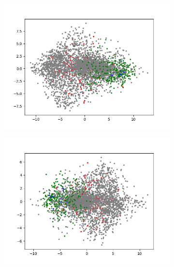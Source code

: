 \begin{figure}[H]
\begin{subfigure}{.25\textwidth}
    \end{subfigure}%
    \begin{subfigure}{.25\textwidth}
        \centering
        \includegraphics[width=\textwidth]{images/figures/experiments_latent/pooling_dim1024_PCA_classes.png}
    \end{subfigure}%
    \begin{subfigure}{.25\textwidth}
        \centering
        \includegraphics[width=\textwidth]{images/figures/experiments_latent/pooling_dim50_PCA_classes.png}
    \end{subfigure}
    \begin{subfigure}{.25\textwidth}
        \centering

\end{subfigure}
\end{figure}
